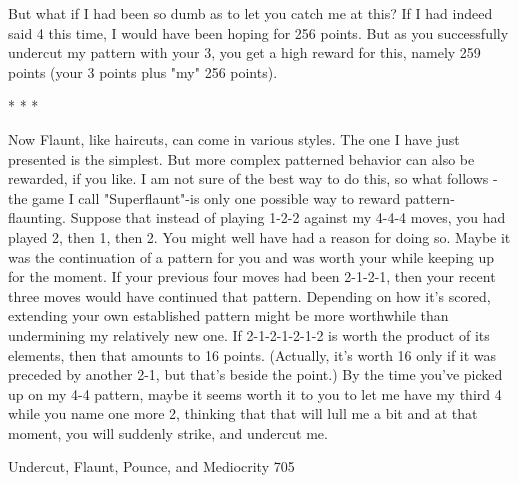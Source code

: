       But what if I had been so dumb as to let you catch me at this? If I had indeed
said 4 this time, I would have been hoping for 256 points. But as you successfully
undercut my pattern with your 3, you get a high reward for this, namely 259 points
(your 3 points plus "my" 256 points).

                                       *   *   *

        Now Flaunt, like haircuts, can come in various styles. The one I have just
presented is the simplest. But more complex patterned behavior can also be rewarded,
if you like. I am not sure of the best way to do this, so what follows -the game I call
"Superflaunt"-is only one possible way to reward pattern-flaunting. Suppose that
instead of playing 1-2-2 against my 4-4-4 moves, you had played 2, then 1, then 2.
You might well have had a reason for doing so. Maybe it was the continuation of a
pattern for you and was worth your while keeping up for the moment. If your previous
four moves had been 2-1-2-1, then your recent three moves would have continued that
pattern. Depending on how it's scored, extending your own established pattern might
be more worthwhile than undermining my relatively new one. If 2-1-2-1-2-1-2 is
worth the product of its elements, then that amounts to 16 points. (Actually, it's worth
16 only if it was preceded by another 2-1, but that's beside the point.) By the time
you've picked up on my 4-4 pattern, maybe it seems worth it to you to let me have my
third 4 while you name one more 2, thinking that that will lull me a bit and at that
moment, you will suddenly strike, and undercut me.




Undercut, Flaunt, Pounce, and Mediocrity                                             705

